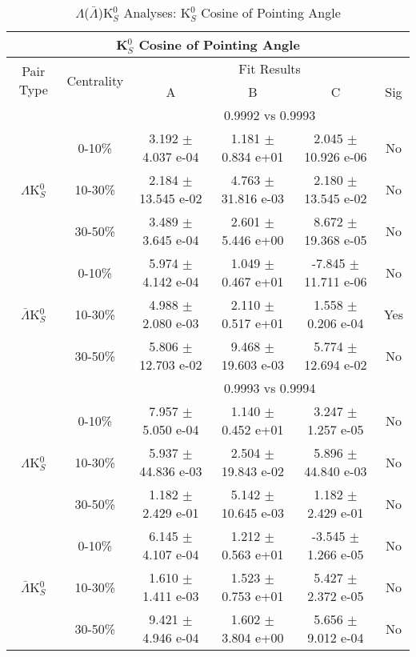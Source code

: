 \documentclass[../AnalysisNoteJBuxton.tex]{subfiles}
\begin{document}
\begin{table}
 \centering
 \begin{tabular}{|c|c|c|c|c|c|}
  \multicolumn{6}{c}{K$^{0}_{S}$ Cosine of Pointing Angle} \\
  \hline
  \multirow{2}{*}{Pair Type} & \multirow{2}{*}{Centrality} & \multicolumn{4}{c|}{Fit Results} \\
  \cline{3-6}
   & & A & B & C & Sig \\  
  \hline
  \multicolumn{2}{|c}{} & \multicolumn{4}{c|}{0.9992 vs 0.9993} \\  
  \hline  
  \multirow{3}{*}{$\Lambda$K$^{0}_{S}$}
   &  0-10\% & 3.192 $\pm$ 4.037 e-04 & 1.181 $\pm$ 0.834 e+01 & 2.045 $\pm$ 10.926 e-06 & No \\
   & 10-30\% & 2.184 $\pm$ 13.545 e-02 & 4.763 $\pm$ 31.816 e-03 & 2.180 $\pm$ 13.545 e-02 & No \\
   & 30-50\% & 3.489 $\pm$ 3.645 e-04 & 2.601 $\pm$ 5.446 e+00 & 8.672 $\pm$ 19.368 e-05 & No \\
  \hline
  \multirow{3}{*}{$\bar{\Lambda}$K$^{0}_{S}$}  
   &  0-10\% & 5.974 $\pm$ 4.142 e-04 & 1.049 $\pm$ 0.467 e+01 & -7.845 $\pm$ 11.711 e-06 & No \\
   & 10-30\% & 4.988 $\pm$ 2.080 e-03 & 2.110 $\pm$ 0.517 e+01 & 1.558 $\pm$ 0.206 e-04 & Yes \\
   & 30-50\% & 5.806 $\pm$ 12.703 e-02 & 9.468 $\pm$ 19.603 e-03 & 5.774 $\pm$ 12.694 e-02 & No \\
  \hline 
  \multicolumn{2}{|c}{} & \multicolumn{4}{c|}{0.9993 vs 0.9994} \\
  \hline  
  \multirow{3}{*}{$\Lambda$K$^{0}_{S}$}   
   &  0-10\% & 7.957 $\pm$ 5.050 e-04 & 1.140 $\pm$ 0.452 e+01 & 3.247 $\pm$ 1.257 e-05 & No \\
   & 10-30\% & 5.937 $\pm$ 44.836 e-03 & 2.504 $\pm$ 19.843 e-02 & 5.896 $\pm$ 44.840 e-03 & No \\
   & 30-50\% & 1.182 $\pm$ 2.429 e-01 & 5.142 $\pm$ 10.645 e-03 & 1.182 $\pm$ 2.429 e-01 & No \\
  \hline  
  \multirow{3}{*}{$\bar{\Lambda}$K$^{0}_{S}$}
   &  0-10\% & 6.145 $\pm$ 4.107 e-04 & 1.212 $\pm$ 0.563 e+01 & -3.545 $\pm$ 1.266 e-05 & No \\
   & 10-30\% & 1.610 $\pm$ 1.411 e-03 & 1.523 $\pm$ 0.753 e+01 & 5.427 $\pm$ 2.372 e-05 & No \\
   & 30-50\% & 9.421 $\pm$ 4.946 e-04 & 1.602 $\pm$ 3.804 e+00 & 5.656 $\pm$ 9.012 e-04 & No \\
  \hline
 \end{tabular}
 \caption{$\Lambda$($\bar{\Lambda}$)K$^{0}_{S}$ Analyses: K$^{0}_{S}$ Cosine of Pointing Angle}
 \label{tab:K0CosPointingAngleLamK0Full}
\end{table}
\end{document}

